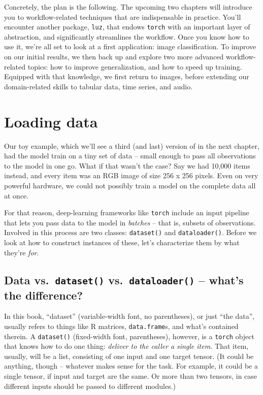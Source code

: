 \documentclass[
  letterpaper,
]{krantz}
\begin{document}
Concretely, the plan is the following. The upcoming two chapters will
introduce you to workflow-related techniques that are indispensable in
practice. You'll encounter another package, \texttt{luz}, that endows
\texttt{torch} with an important layer of abstraction, and significantly
streamlines the workflow. Once you know how to use it, we're all set to
look at a first application: image classification. To improve on our
initial results, we then back up and explore two more advanced
workflow-related topics: how to improve generalization, and how to speed
up training. Equipped with that knowledge, we first return to images,
before extending our domain-related skills to tabular data, time series,
and audio.

\hypertarget{sec:data}{%
\chapter{Loading data}\label{sec:data}}

Our toy example, which we'll see a third (and last) version of in the
next chapter, had the model train on a tiny set of data -- small enough
to pass all observations to the model in one go. What if that wasn't the
case? Say we had 10,000 items instead, and every item was an RGB image
of size 256 x 256 pixels. Even on very powerful hardware, we could not
possibly train a model on the complete data all at once.

For that reason, deep-learning frameworks like \texttt{torch} include an
input pipeline that lets you pass data to the model in \emph{batches} --
that is, subsets of observations. Involved in this process are two
classes: \texttt{dataset()} and \texttt{dataloader()}. Before we look at
how to construct instances of these, let's characterize them by what
they're \emph{for}.

\hypertarget{data-vs.-dataset-vs.-dataloader-whats-the-difference}{%
\section{\texorpdfstring{Data
vs.~\texttt{dataset()}
vs.~\texttt{dataloader()} -- what's the
difference?}{Data vs.~dataset() vs.~dataloader() -- what's the difference?}}\label{data-vs.-dataset-vs.-dataloader-whats-the-difference}}

In this book, ``dataset'' (variable-width font, no parentheses), or just
``the data'', usually refers to things like R matrices,
\texttt{data.frame}s, and what's contained therein. A \texttt{dataset()}
(fixed-width font, parentheses), however, is a \texttt{torch} object
that knows how to do one thing: \emph{deliver to the caller a}
\emph{single item.} That item, usually, will be a list, consisting of
one input and one target tensor. (It could be anything, though --
whatever makes sense for the task. For example, it could be a single
tensor, if input and target are the same. Or more than two tensors, in
case different inputs should be passed to different modules.)
\end{document}
